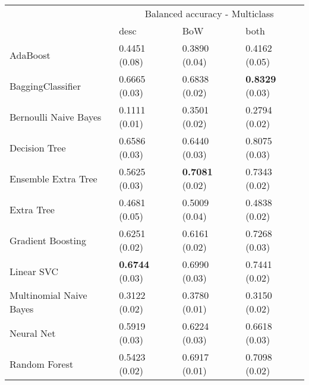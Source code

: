 \begin{tabular}{|l|l|l|l| }
\hline
 &  \multicolumn{3}{c|}{ Balanced accuracy - Multiclass} \\
\cline{2-4} & desc & BoW & both \\ \hline
AdaBoost                & 0.4451 (0.08) & 0.3890 (0.04) & 0.4162 (0.05)\\
BaggingClassifier       & 0.6665 (0.03) & 0.6838 (0.02) & {\bf 0.8329} (0.03)\\
Bernoulli Naive Bayes   & 0.1111 (0.01) & 0.3501 (0.02) & 0.2794 (0.02)\\
Decision Tree           & 0.6586 (0.03) & 0.6440 (0.03) & 0.8075 (0.03)\\
Ensemble Extra Tree     & 0.5625 (0.03) & {\bf 0.7081} (0.02) & 0.7343 (0.02)\\
Extra Tree              & 0.4681 (0.05) & 0.5009 (0.04) & 0.4838 (0.02)\\
Gradient Boosting       & 0.6251 (0.02) & 0.6161 (0.02) & 0.7268 (0.03)\\
Linear SVC              & {\bf 0.6744} (0.03) & 0.6990 (0.03) & 0.7441 (0.02)\\
Multinomial Naive Bayes & 0.3122 (0.02) & 0.3780 (0.01) & 0.3150 (0.02)\\
Neural Net              & 0.5919 (0.03) & 0.6224 (0.03) & 0.6618 (0.03)\\
Random Forest           & 0.5423 (0.02) & 0.6917 (0.01) & 0.7098 (0.02)\\
\hline
\end{tabular}